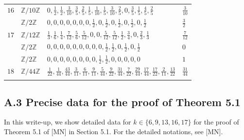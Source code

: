 \documentclass[10pt]{article}
\begin{document}
\begin{longtable}{llll}
 \vspace{1mm}$16$ &$ \mathbb{Z}/10\mathbb{Z}$& $0,\frac{1}{2},\frac{1}{2},\frac{3}{10},\frac{3}{5},\frac{2}{5},\frac{1}{5},\frac{1}{10},\frac{1}{5},\frac{3}{10},\frac{2}{5},0,\frac{3}{5},\frac{1}{5},\frac{4}{5},\frac{2}{5}$  & $\frac{3}{10}$ \vspace{1mm}\\
 \vspace{1mm}  &$ \mathbb{Z}/2\mathbb{Z}$ & $0,0,0,0,0,0,0,\frac{1}{2},0,\frac{1}{2},0,\frac{1}{2},0,\frac{1}{2},0,\frac{1}{2} $ & $\frac{3}{2}$ \\
  \vspace{1mm}$17$ &$ \mathbb{Z}/12\mathbb{Z}$ & $\frac{1}{3},\frac{1}{6},\frac{1}{4},\frac{7}{12},\frac{5}{6},\frac{5}{12},0,0,\frac{5}{12},\frac{5}{12},\frac{1}{2},\frac{3}{4},0,\frac{2}{3},\frac{1}{3}$  & $\frac{7}{12}$ \vspace{1mm}\\
   \vspace{1mm}  &$ \mathbb{Z}/2\mathbb{Z}$& $0, 0, 0, 0, 0, 0, 0, 0, 0, \frac{1}{2}, \frac{1}{2}, 0, \frac{1}{2}, 0, \frac{1}{2} $  & $0$ \vspace{1mm}\\
    \vspace{1mm} &$ \mathbb{Z}/2\mathbb{Z}$& $0,0,0,0,0,0,0,0,\frac{1}{2},\frac{1}{2},0,0,0,0,0 $  & $1$ \vspace{1mm}\\
  $18$ &$ \mathbb{Z}/44\mathbb{Z}$ &  $\frac{1}{22},\frac{1}{44},\frac{43}{44},\frac{3}{11},\frac{6}{11},\frac{9}{11},\frac{5}{44},\frac{9}{22},\frac{31}{44},\frac{7}{22},\frac{29}{44},\frac{17}{44},\frac{17}{22},\frac{2}{11},\frac{13}{22}$ & $\frac{31}{44}$ \vspace{1mm}\\
\hline\\
\end{longtable} 






\subsection*{A.3 Precise data for the proof of Theorem 5.1}


In this write-up, we show detailed data for $k\in \{6,9,13, 16, 17\}$ for the proof of Theorem 5.1 of [MN]  in Section 5.1.
For the detailed notations, see [MN].  
\end{document}
